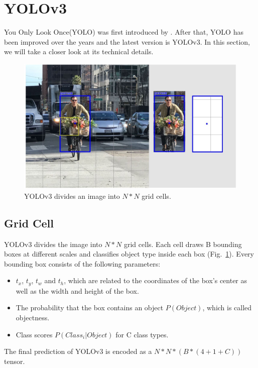 \documentclass[letterpaper]{article} %
\begin{document}
\section{YOLOv3}
You Only Look Once(YOLO) was first introduced by \cite{YOLO}. After that, YOLO has been improved over the years and the latest version is YOLOv3\cite{YOLOv3}. In this section, we will take a closer look at its technical details.
\begin{figure}[ht]
\hspace{-6mm}
\centering
\includegraphics[width=0.85\linewidth,height = 0.5\linewidth]{Figure/gridcells.JPG}
\caption{\footnotesize{YOLOv3 divides an image into $N*N$ grid cells.}}
\label{fig:cells}
\vspace{-2mm}
\end{figure}
\subsection{Grid Cell}
YOLOv3 divides the image into $N*N$ grid cells. Each cell draws B bounding boxes at different scales and classifies object type inside each box (Fig.~\ref{fig:cells}). Every bounding box consists of the following parameters:
\begin{itemize}
    \item $t_x$, $t_y$, $t_w$ and $t_h$, which are related to the coordinates of the box's center as well as the width and height of the box.
    \item The probability that the box contains an object $P(Object)$, which is called objectness.
    \item Class scores $P(Class_{i}|Object)$ for C class types.
\end{itemize}
The final prediction of YOLOv3 is encoded as a $N*N*(B*(4+1+C))$ tensor.
\end{document}
